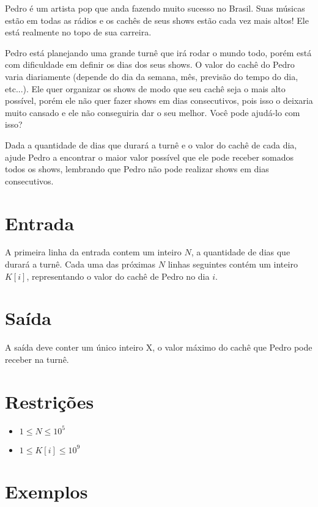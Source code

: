 Pedro é um artista pop que anda fazendo muito sucesso no Brasil. Suas músicas estão em todas as rádios e os cachês de seus shows estão cada vez mais altos! Ele está realmente no topo de sua carreira.

Pedro está planejando uma grande turnê que irá rodar o mundo todo, porém está com dificuldade em definir os dias dos seus shows. O valor do cachê do Pedro varia diariamente (depende do dia da semana, mês, previsão do tempo do dia, etc...). Ele quer organizar os shows de modo que seu cachê seja o mais alto possível, porém ele não quer fazer shows em dias consecutivos, pois isso o deixaria muito cansado e ele não conseguiria dar o seu melhor.  Você pode ajudá-lo com isso?

Dada a quantidade de dias que durará a turnê e o valor do cachê de cada dia, ajude Pedro a encontrar o maior valor possível que ele pode receber somados todos os shows, lembrando que Pedro não pode realizar shows em dias consecutivos.

\section*{Entrada}

A primeira linha da entrada contem um inteiro $N$, a quantidade de dias que durará a turnê. Cada uma das próximas $N$ linhas seguintes contém um inteiro $K[i]$, representando o valor do cachê de Pedro no dia $i$.

\section*{Saída}

A saída deve conter um único inteiro X, o valor máximo do cachê que Pedro pode receber na turnê.

\section*{Restrições}

\begin{itemize}
\item $1 \leq N \leq 10^5$
\item $1 \leq K[i] \leq 10^9$
\end{itemize}


\section*{Exemplos}

\exemplo
